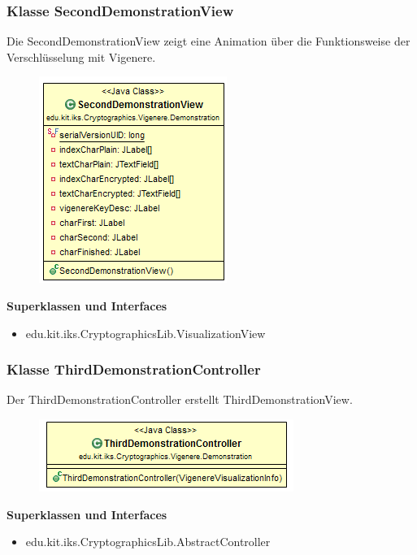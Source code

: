 \documentclass{article}
\begin{document}
    \subsubsection{Klasse SecondDemonstrationView}
      Die SecondDemonstrationView zeigt eine Animation über die Funktionsweise der Verschlüsselung mit Vigenere.
      \begin{figure}[H]
        \centering
        \includegraphics{resources/edu-kit-iks-Cryptographics-Vigenere-SecondDemonstrationView}
      \end{figure}

      \textbf{Superklassen und Interfaces}
      \begin{itemize}
        \item edu.kit.iks.CryptographicsLib.VisualizationView
      \end{itemize}

    \subsubsection{Klasse ThirdDemonstrationController}
      Der ThirdDemonstrationController erstellt ThirdDemonstrationView.
      \begin{figure}[H]
        \centering
        \includegraphics{resources/edu-kit-iks-Cryptographics-Vigenere-ThirdDemonstrationController}
      \end{figure}

      \textbf{Superklassen und Interfaces}
      \begin{itemize}
        \item edu.kit.iks.CryptographicsLib.AbstractController
      \end{itemize}
\end{document}
